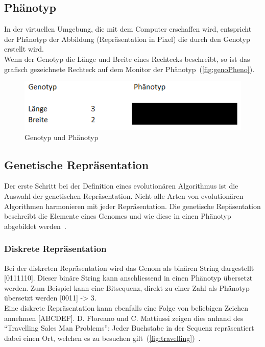     \subsection{Phänotyp\label{sub:phenotyp}}

      In der virtuellen Umgebung, die mit dem Computer erschaffen wird,
      entspricht der Phänotyp der Abbildung (Repräsentation in Pixel) die durch den Genotyp erstellt wird.
      \\
      Wenn der Genotyp die Länge und Breite eines Rechtecks beschreibt,
      so ist das grafisch gezeichnete Rechteck auf dem Monitor der Phänotyp~(\vref{fig:genoPheno}).

      \begin{figure}[H]
        \includegraphics[scale=1]{graphics/genotyp_phenotyp}
        \caption{Genotyp und Phänotyp\label{fig:genoPheno}}
      \end{figure}

    \subsection{Genetische Repräsentation}

      Der erste Schritt bei der Definition eines evolutionären Algorithmus ist die Auswahl der genetischen Repräsentation.
      Nicht alle Arten von evolutionären Algorithmen harmonieren mit jeder Repräsentation.
      Die genetische Repäsentation beschreibt die Elemente eines Genomes und
      wie diese in einen Phänotyp abgebildet werden~\cite[S.16]{book:bioInspired}.

      \subsubsection{Diskrete Repräsentation\label{subsub:GeneticRepresentationDiscrete}}

        Bei der diskreten Repräsentation wird das Genom als binären String dargestellt [0111110].
        Dieser binäre String kann anschliessend in einen Phänotyp übersetzt werden.
        Zum Beispiel kann eine Bitsequenz, direkt zu einer Zahl als Phänotyp übersetzt werden [0011] -> 3.
        \\
        Eine diskrete Repräsentation kann ebenfalls eine Folge von beliebigen Zeichen annehmen [ABCDEF].
        D. Floreano und C. Mattiussi zeigen dies anhand des ``Travelling Sales Man Problems'':
        Jeder Buchstabe in der Sequenz repräsentiert dabei einen Ort,
        welchen es zu besuchen gilt~(\vref{fig:travelling})~\cite[S.18]{book:bioInspired}.

